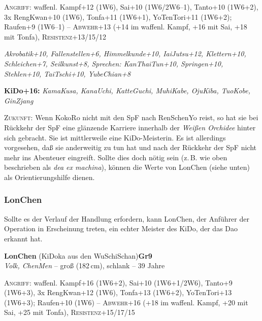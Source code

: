 \documentclass[
a4paper,
twoside,
DIV=calc,
BCOR=4mm,
fontsize=9pt,
twocolumn=on,
titlepage=on,
parskip=half
]{scrartcl}
\begin{document}
\textsc{Angriff:} waffenl. Kampf+12 (1W6), Sai+10 (1W6/2W6--1),
Tanto+10 (1W6+2), 3x RengKwan+10 (1W6), Tonfa+11 (1W6+1), YoTenTori+11
(1W6+2); Raufen+9 (1W6--1) -- \textsc{Abwehr}+13 (+14 im
waffenl. Kampf, +16 mit Sai, +18 mit Tonfa),
\textsc{Resistenz}+13/15/12

\emph{Akrobatik+10, Fallenstellen+6, Himmelkunde+10, IaiJutsu+12,
  Klettern+10, Schleichen+7, Seilkunst+8, Sprechen: KanThaiTun+10,
  Springen+10, Stehlen+10, TaiTschi+10, YubeChian+8}

\textbf{KiDo+16:} \emph{KamaKusa, KanaUchi, KatteGuchi, MuhiKabe,
  OjuKiba, TuoKobe, GinZjang}

\textsc{Zukunft:} Wenn KokoRo nicht mit den SpF nach RenSchenYo reist,
so hat sie bei Rückkehr der SpF eine glänzende Karriere innerhalb der
\emph{Weißen Orchidee} hinter sich gebracht. Sie ist mittlerweile eine
KiDo-Meisterin. Es ist allerdings vorgesehen, daß sie anderweitig zu
tun hat und nach der Rückkehr der SpF nicht mehr ins Abenteuer
eingreift. Sollte dies doch nötig sein (z.\,B. wie oben beschrieben
als \emph{dea ex machina}), können die Werte von LonChen (siehe
unten) als Orientierungshilfe dienen.

\subsubsection{LonChen}

Sollte es der Verlauf der Handlung erfordern, kann LonChen, der
Anführer der Operation in Erscheinung treten, ein echter Meister des
KiDo, der das Dao erkannt hat.

\textbf{LonChen} (KiDoka aus den WuSchiSchan)\hfill \textbf{Gr9}\\
\emph{Volk, ChenMen} -- groß (182\,cm), schlank -- 39 Jahre


\textsc{Angriff:} waffenl. Kampf+16 (1W6+2), Sai+10 (1W6+1/2W6),
Tanto+9 (1W6+3), 3x RengKwan+12 (1W6), Tonfa+13 (1W6+2), YoTenTori+13
(1W6+3); Raufen+10 (1W6) -- \textsc{Abwehr}+16 (+18 im
waffenl. Kampf, +20 mit Sai, +25 mit Tonfa),
\textsc{Resistenz}+15/17/15
\end{document}
